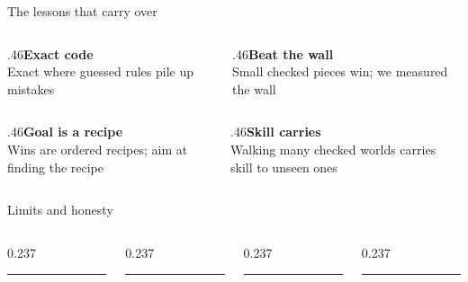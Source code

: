 \documentclass[aspectratio=169,11pt]{beamer}
\begin{document}
\begin{frame}{The lessons that carry over}\vfill\begin{columns}[T]\begin{column}{.46\textwidth}{\color{owdeep}\bfseries Exact code}\\[2pt]{\color{owmuted}\small Exact where guessed rules pile up mistakes}\end{column}\begin{column}{.46\textwidth}{\color{owdeep}\bfseries Beat the wall}\\[2pt]{\color{owmuted}\small Small checked pieces win; we measured the wall}\end{column}\end{columns}\vskip12pt\begin{columns}[T]\begin{column}{.46\textwidth}{\color{owdeep}\bfseries Goal is a recipe}\\[2pt]{\color{owmuted}\small Wins are ordered recipes; aim at finding the recipe}\end{column}\begin{column}{.46\textwidth}{\color{owdeep}\bfseries Skill carries}\\[2pt]{\color{owmuted}\small Walking many checked worlds carries skill to unseen ones}\end{column}\end{columns}\vfill\end{frame}
\begin{frame}{Limits and honesty}\vfill\begin{columns}[T]\begin{column}{0.237\textwidth}{\color{owteal}\rule{20pt}{3pt}}\par{}\par{}\end{column}\begin{column}{0.237\textwidth}{\color{owochre}\rule{20pt}{3pt}}\par{}\par{}\end{column}\begin{column}{0.237\textwidth}{\color{owblue}\rule{20pt}{3pt}}\par{}\par{}\end{column}\begin{column}{0.237\textwidth}{\color{owmuted}\rule{20pt}{3pt}}\par{}\par{}\end{column}\end{columns}\vfill\end{frame}
\end{document}
